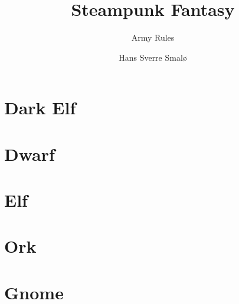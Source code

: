 
\hypersetup{
    colorlinks=true, %
    linktoc=all,     %
    linkcolor=blue,  %
}





\title{Steampunk Fantasy}
\subtitle{Army Rules}
\author{Hans Sverre Smal\o}


\maketitle
\tableofcontents

\chapter{Dark Elf}


\chapter{Dwarf}


\chapter{Elf}


\chapter{Ork}



\chapter{Gnome}



